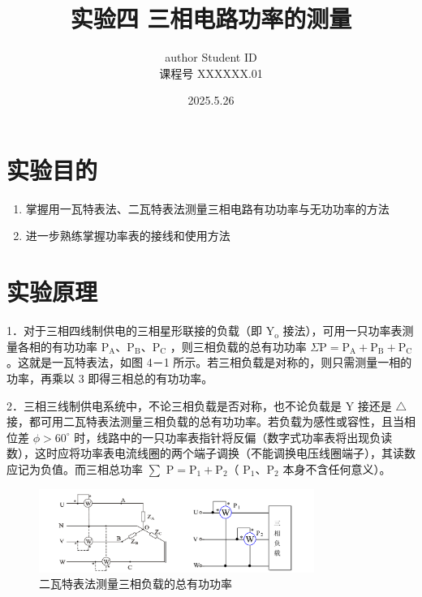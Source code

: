 \documentclass{article}
\title{\heiti\zihao{2}实验四 \quad 三相电路功率的测量}
\author{\songti  author  Student ID  \\
课程号  XXXXXX.01 }
\date{2025.5.26}
\begin{document}
    \maketitle
\begin{abstract}
    
\end{abstract}
\section{实验目的}
\begin{enumerate}
    \item 掌握用一瓦特表法、二瓦特表法测量三相电路有功功率与无功功率的方法
    \item 进一步熟练掌握功率表的接线和使用方法
\end{enumerate}

\section{实验原理}
1．对于三相四线制供电的三相星形联接的负载（即 $\mathrm{Y}_{\mathrm{o}}$ 接法），可用一只功率表测量各相的有功功率 $\mathrm{P}_{\mathrm{A}} 、 \mathrm{P}_{\mathrm{B}} 、 \mathrm{P}_{\mathrm{C}}$ ，则三相负载的总有功功率 $\Sigma \mathrm{P}=\mathrm{P}_{\mathrm{A}}+\mathrm{P}_{\mathrm{B}}+\mathrm{P}_{\mathrm{C}}$ 。这就是一瓦特表法，如图 4－1 所示。若三相负载是对称的，则只需测量一相的功率，再乘以 3 即得三相总的有功功率。

2．三相三线制供电系统中，不论三相负载是否对称，也不论负载是 Y 接还是 $\triangle$ 接，都可用二瓦特表法测量三相负载的总有功功率。若负载为感性或容性，且当相位差 $\phi>60^{\circ}$ 时，线路中的一只功率表指针将反偏（数字式功率表将出现负读数），这时应将功率表电流线圈的两个端子调换（不能调换电压线圈端子），其读数应记为负值。而三相总功率 $\sum$ $\mathrm{P}=\mathrm{P}_1+\mathrm{P}_2$（ $\mathrm{P}_1 、 \mathrm{P}_2$ 本身不含任何意义）。
\begin{figure}[H]
    \centering
    \includegraphics[width=0.8\textwidth]{img1.png}
    \caption{二瓦特表法测量三相负载的总有功功率}
\end{figure}
\end{document}
